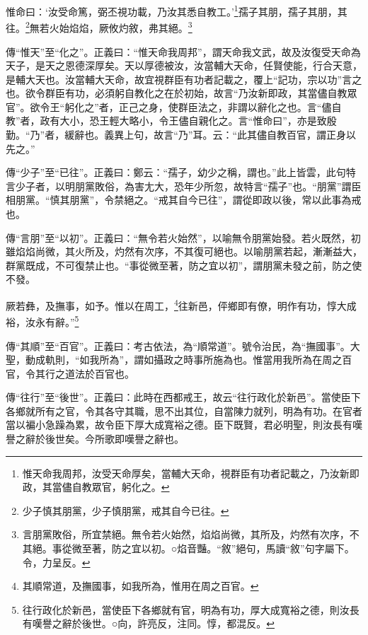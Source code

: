 惟命曰：‘汝受命篤，弼丕視功載，乃汝其悉自教工。’\footnote{惟天命我周邦，汝受天命厚矣，當輔大天命，視群臣有功者記載之，乃汝新即政，其當儘自教眾官，躬化之。}孺子其朋，孺子其朋，其往。\footnote{少子慎其朋黨，少子慎朋黨，戒其自今已往。}無若火始焰焰，厥攸灼敘，弗其絕。\footnote{言朋黨敗俗，所宜禁絕。無令若火始然，焰焰尚微，其所及，灼然有次序，不其絕。事從微至著，防之宜以初。○焰音豔。“敘”絕句，馬讀“敘”句字屬下。令，力呈反。}


{\noindent\zhuan{}\fzbyks 傳“惟天”至“化之”。正義曰：“惟天命我周邦”，謂天命我文武，故及汝復受天命為天子，是天之恩德深厚矣。天以厚德被汝，汝當輔大天命，任賢使能，行合天意，是輔大天也。汝當輔大天命，故宜視群臣有功者記載之，覆上“記功，宗以功”言之也。欲令群臣有功，必須躬自教化之在於初始，故言“乃汝新即政，其當儘自教眾官”。欲令王“躬化之”者，正己之身，使群臣法之，非謂以辭化之也。言“儘自教”者，政有大小，恐王輕大略小，令王儘自親化之。言“惟命曰”，亦是致殷勤。“乃”者，緩辭也。義異上句，故言“乃”耳。云：“此其儘自教百官，謂正身以先之。” \par}

{\noindent\zhuan{}\fzbyks 傳“少子”至“已往”。正義曰：鄭云：“孺子，幼少之稱，謂也。”此上皆雲，此句特言少子者，以明朋黨敗俗，為害尢大，恐年少所忽，故特言“孺子”也。“朋黨”謂臣相朋黨。“慎其朋黨”，令禁絕之。“戒其自今已往”，謂從即政以後，常以此事為戒也。 \par}

{\noindent\zhuan{}\fzbyks 傳“言朋”至“以初”。正義曰：“無令若火始然”，以喻無令朋黨始發。若火既然，初雖焰焰尚微，其火所及，灼然有次序，不其復可絕也。以喻朋黨若起，漸漸益大，群黨既成，不可復禁止也。“事從微至著，防之宜以初”，謂朋黨未發之前，防之使不發。 \par}

厥若彝，及撫事，如予。惟以在周工，\footnote{其順常道，及撫國事，如我所為，惟用在周之百官。}往新邑，伻鄉即有僚，明作有功，惇大成裕，汝永有辭。”\footnote{往行政化於新邑，當使臣下各鄉就有官，明為有功，厚大成寬裕之德，則汝長有嘆譽之辭於後世。○向，許亮反，注同。惇，都混反。}

{\noindent\zhuan{}\fzbyks 傳“其順”至“百官”。正義曰：考古依法，為“順常道”。號令治民，為“撫國事”。大聖，動成軌則，“如我所為”，謂如攝政之時事所施為也。惟當用我所為在周之百官，令其行之道法於百官也。 \par}

{\noindent\zhuan{}\fzbyks 傳“往行”至“後世”。正義曰：此時在西都戒王，故云“往行政化於新邑”。當使臣下各鄉就所有之官，令其各守其職，思不出其位，自當陳力就列，明為有功。在官者當以褊小急躁為累，故令臣下厚大成寬裕之德。臣下既賢，君必明聖，則汝長有嘆譽之辭於後世矣。今所歌即嘆譽之辭也。 \par}

